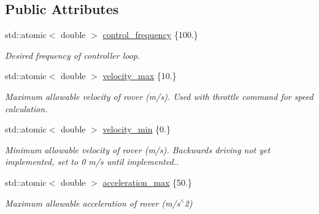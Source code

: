 \subsection*{Public Attributes}
\begin{DoxyCompactItemize}
\item 
\mbox{\label{structackermann_1_1_params_a065f737848871356232ff7092baed140}} 
std\+::atomic$<$ double $>$ \hyperlink{structackermann_1_1_params_a065f737848871356232ff7092baed140}{control\+\_\+frequency} \{100.\}
\begin{DoxyCompactList}\small\item\em Desired frequency of controller loop. \end{DoxyCompactList}\item 
\mbox{\label{structackermann_1_1_params_ab41d61361183158ea37d6c8577dcad82}} 
std\+::atomic$<$ double $>$ \hyperlink{structackermann_1_1_params_ab41d61361183158ea37d6c8577dcad82}{velocity\+\_\+max} \{10.\}
\begin{DoxyCompactList}\small\item\em Maximum allowable velocity of rover (m/s). Used with throttle command for speed calculation. \end{DoxyCompactList}\item 
\mbox{\label{structackermann_1_1_params_ad6c5babc5a52cf56d57ea664ca5a0c04}} 
std\+::atomic$<$ double $>$ \hyperlink{structackermann_1_1_params_ad6c5babc5a52cf56d57ea664ca5a0c04}{velocity\+\_\+min} \{0.\}
\begin{DoxyCompactList}\small\item\em Minimum allowable velocity of rover (m/s). Backwards driving not yet implemented, set to 0 m/s until implemented.. \end{DoxyCompactList}\item 
\mbox{\label{structackermann_1_1_params_a7273215906e350eb609b463398acbfba}} 
std\+::atomic$<$ double $>$ \hyperlink{structackermann_1_1_params_a7273215906e350eb609b463398acbfba}{acceleration\+\_\+max} \{50.\}
\begin{DoxyCompactList}\small\item\em Maximum allowable acceleration of rover (m/s$^\wedge$2) \end{DoxyCompactList}\item 

\end{DoxyCompactItemize}
